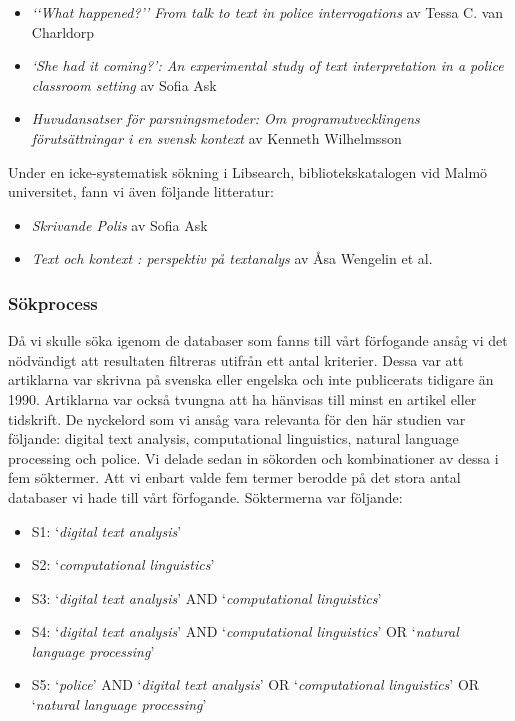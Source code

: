 \documentclass[swedish]{maucsthesis}
\begin{document}
\begin{itemize}
\item \textit{‘‘What happened?’’ From talk to text in police interrogations} av
  Tessa C. van Charldorp
\item \textit{‘She had it coming?’: An experimental study of text interpretation
    in a police classroom setting} av Sofia Ask
\item \textit{Huvudansatser för parsningsmetoder: Om programutvecklingens
    förutsättningar i en svensk kontext} av Kenneth Wilhelmsson
\end{itemize}

Under en icke-systematisk sökning i Libsearch, bibliotekskatalogen vid Malmö
universitet, fann vi även följande litteratur:

\begin{itemize}
\item \textit{Skrivande Polis} av Sofia Ask
\item \textit{Text och kontext : perspektiv på textanalys} av Åsa Wengelin et al.
\end{itemize}

\subsubsection{Sökprocess}

Då vi skulle söka igenom de databaser som fanns till vårt förfogande ansåg vi
det nödvändigt att resultaten filtreras utifrån ett antal kriterier. Dessa var
att artiklarna var skrivna på svenska eller engelska och inte publicerats
tidigare än 1990. Artiklarna var också tvungna att ha hänvisas till minst en
artikel eller tidskrift. De nyckelord som vi ansåg vara relevanta för den här
studien var följande: digital text analysis, computational linguistics, natural
language processing och police. Vi delade sedan in sökorden och kombinationer av
dessa i fem söktermer. Att vi enbart valde fem termer berodde på det stora antal
databaser vi hade till vårt förfogande. Söktermerna var följande:

\begin{itemize}
\item S1: ‘\textit{digital text analysis}’
\item S2: ‘\textit{computational linguistics}’
\item S3: ‘\textit{digital text analysis}’ AND ‘\textit{computational
    linguistics}’
\item S4: ‘\textit{digital text analysis}’ AND ‘\textit{computational
    linguistics}’ OR ‘\textit{natural language processing}’
\item S5: ‘\textit{police}’ AND ‘\textit{digital text analysis}’ OR
  ‘\textit{computational linguistics}’ OR ‘\textit{natural language processing}’
\end{itemize}
\end{document}

